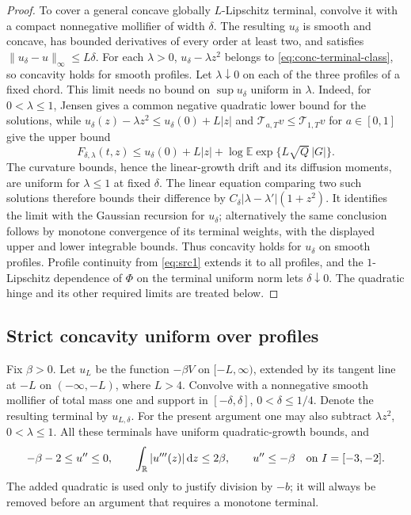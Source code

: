 \documentclass[11pt,a4paper]{article}
\numberwithin{equation}{section}
\theoremstyle{definition}
\theoremstyle{remark}
\newcommand{\E}{\mathbb E}
\newcommand{\R}{\mathbb R}
\newcommand{\dd}{\mathrm d}
\begin{document}
\begin{proof}
To cover a general concave globally $L$-Lipschitz terminal, convolve it with
a compact nonnegative mollifier of width $\delta$.  The resulting
$u_\delta$ is smooth and concave, has bounded derivatives of every order
at least two, and satisfies $\|u_\delta-u\|_\infty\leq L\delta$.
For each $\lambda>0$, $u_\delta-\lambda z^2$ belongs to
\eqref{eq:conc-terminal-class}, so concavity holds for smooth profiles.
Let $\lambda\downarrow0$ on each of the three profiles of a fixed chord.
This limit needs no bound on $\sup u_\delta$ uniform in $\lambda$.
Indeed, for $0<\lambda\leq1$, Jensen gives a common negative quadratic
lower bound for the solutions, while
$u_\delta(z)-\lambda z^2\leq u_\delta(0)+L|z|$ and
$\mathcal T_{a,T}v\leq\mathcal T_{1,T}v$ for $a\in[0,1]$ give the
upper bound
\[
 F_{\delta,\lambda}(t,z)
 \leq u_\delta(0)+L|z|+
       \log\E\exp\{L\sqrt Q\,|G|\}.
\]
The curvature bounds, hence the linear-growth drift and its diffusion
moments, are uniform for $\lambda\leq1$ at fixed $\delta$.
The linear equation comparing two such solutions therefore bounds their
difference by $C_\delta|\lambda-\lambda'|(1+z^2)$.
It identifies the limit with the Gaussian recursion for $u_\delta$;
alternatively the same conclusion follows by monotone convergence of its
terminal weights, with the displayed upper and lower integrable bounds.
Thus concavity holds for $u_\delta$ on smooth profiles.
Profile continuity from \eqref{eq:src1} extends it to all profiles, and
the $1$-Lipschitz dependence of $\Phi$ on the terminal uniform norm lets
$\delta\downarrow0$.  The quadratic hinge and its other required limits
are treated below.
\end{proof}

\subsection{Strict concavity uniform over profiles}

Fix $\beta>0$.  Let $u_L$ be the function $-\beta V$ on $[-L,\infty)$,
extended by its tangent line at $-L$ on $(-\infty,-L)$, where $L>4$.
Convolve with a nonnegative smooth mollifier of total mass one and support
in $[-\delta,\delta]$, $0<\delta\leq1/4$.  Denote the resulting terminal by
$u_{L,\delta}$.  For the present argument one may also subtract
$\lambda z^2$, $0<\lambda\leq1$.
All these terminals have uniform quadratic-growth bounds, and
\begin{equation}
 -\beta-2\leq u''\leq0,\qquad
 \int_\R|u'''(z)|\,\dd z\leq2\beta,
 \qquad u''\leq-\beta\quad\hbox{on }I=[-3,-2].
 \label{eq:conc-base-bounds}
\end{equation}
The added quadratic is used only to justify division by $-b$; it will
always be removed before an argument that requires a monotone terminal.
\end{document}
